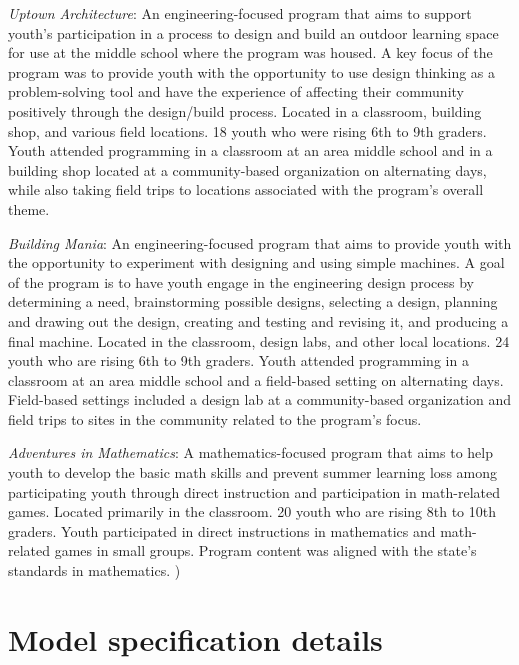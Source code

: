 \documentclass[]{msu-thesis}
\theoremstyle{definition}
\theoremstyle{definition}
\theoremstyle{definition}
\theoremstyle{remark}
\begin{document}
\begin{appendices}
\emph{Uptown Architecture}: An engineering-focused program that aims to
support youth's participation in a process to design and build an
outdoor learning space for use at the middle school where the program
was housed. A key focus of the program was to provide youth with the
opportunity to use design thinking as a problem-solving tool and have
the experience of affecting their community positively through the
design/build process. Located in a classroom, building shop, and various
field locations. 18 youth who were rising 6th to 9th graders. Youth
attended programming in a classroom at an area middle school and in a
building shop located at a community-based organization on alternating
days, while also taking field trips to locations associated with the
program's overall theme.

\emph{Building Mania}: An engineering-focused program that aims to
provide youth with the opportunity to experiment with designing and
using simple machines. A goal of the program is to have youth engage in
the engineering design process by determining a need, brainstorming
possible designs, selecting a design, planning and drawing out the
design, creating and testing and revising it, and producing a final
machine. Located in the classroom, design labs, and other local
locations. 24 youth who are rising 6th to 9th graders. Youth attended
programming in a classroom at an area middle school and a field-based
setting on alternating days. Field-based settings included a design lab
at a community-based organization and field trips to sites in the
community related to the program's focus.

\emph{Adventures in Mathematics}: A mathematics-focused program that
aims to help youth to develop the basic math skills and prevent summer
learning loss among participating youth through direct instruction and
participation in math-related games. Located primarily in the classroom.
20 youth who are rising 8th to 10th graders. Youth participated in
direct instructions in mathematics and math-related games in small
groups. Program content was aligned with the state's standards in
mathematics. )

\chapter{Model specification details}


\end{appendices}
\end{document}
